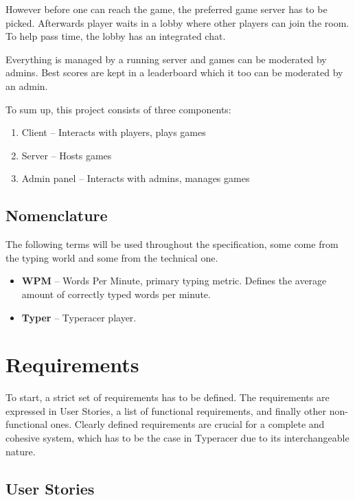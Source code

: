 \documentclass[titlepage]{article}
\begin{document}
However before one can reach the game, the preferred game server has to be picked. Afterwards player waits in a lobby where other players can join the room. To help pass time, the lobby has an integrated chat.

Everything is managed by a running server and games can be moderated by admins. Best scores are kept in a leaderboard which it too can be moderated by an admin.

To sum up, this project consists of three components:

\begin{enumerate}
	\item Client -- Interacts with players, plays games
	\item Server -- Hosts games
	\item Admin panel -- Interacts with admins, manages games
\end{enumerate}

\subsection{Nomenclature} \label{nomenclature}

The following terms will be used throughout the specification, some come from the typing world and some from the technical one.

\begin{itemize}
	\item {\bf WPM} -- Words Per Minute, primary typing metric. Defines the average amount of correctly typed words per minute.

	\item {\bf Typer} -- Typeracer player.
\end{itemize}

\section{Requirements}

To start, a strict set of requirements has to be defined. The requirements are expressed in User Stories, a list of functional requirements, and finally other non-functional ones. Clearly defined requirements are crucial for a complete and cohesive system, which has to be the case in Typeracer due to its interchangeable nature.

\subsection{User Stories}
\end{document}

